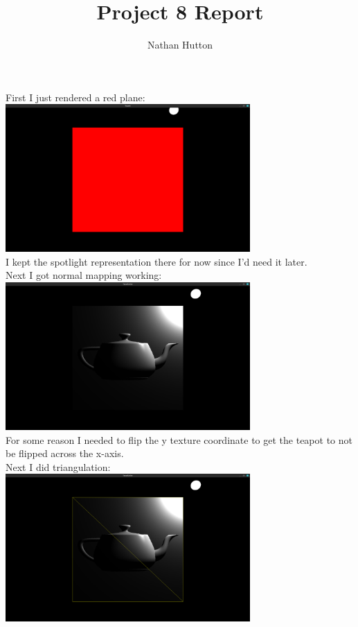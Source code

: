 \documentclass{article}
\title{Project 8 Report}
\author{Nathan Hutton}
\date{}
\begin{document}
\maketitle

First I just rendered a red plane:\\
\includegraphics[width=0.7\textwidth]{images/redPlane.png}\\
I kept the spotlight representation there for now since I'd need it later.\\[2mm]
Next I got normal mapping working:\\
\includegraphics[width=0.7\textwidth]{images/normalMap.png}\\
For some reason I needed to flip the y texture coordinate to get the teapot to not be flipped across the x-axis.\\
Next I did triangulation:\\
\includegraphics[width=0.7\textwidth]{images/normalTriangulation.png}\\
\end{document}
